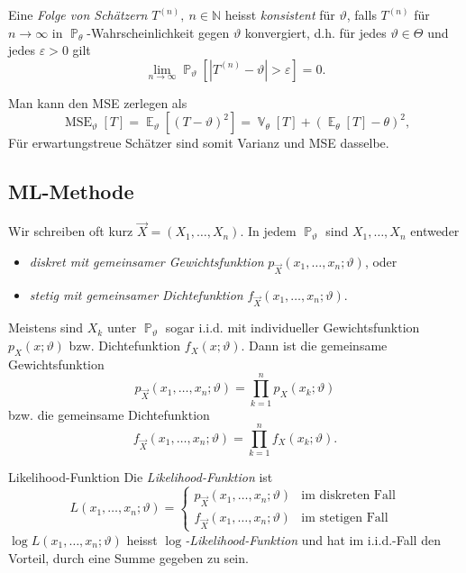 \documentclass[a4paper,10pt]{article}
\def\N{\mathbb{N}}
\renewcommand{\P}{\operatorname{\mathbb{P}}}
\DeclareMathOperator{\E}{\mathbb{E}}
\DeclareMathOperator{\V}{\mathbb{V}}
\DeclareMathOperator{\mse}{MSE}
\numberwithin{equation}{section}
\begin{document}
\begin{mainbox}{}
    Eine \emph{Folge von Schätzern} \( T^{(n)}, \ n \in \N \) heisst \emph{konsistent} für \( \vartheta \), falls \( T^{(n)} \) für \( n \to \infty \) in \( \P_\theta \)-Wahrscheinlichkeit gegen \( \vartheta \) konvergiert, d.h. für jedes \( \vartheta \in \Theta \) und jedes \( \varepsilon > 0 \) gilt
    \[
        \lim_{n \to \infty} \P_\vartheta[|T^{(n)} - \vartheta| > \varepsilon] = 0 \text{.}
    \]
\end{mainbox}

Man kann den MSE zerlegen als
\[
    \mse_\vartheta[T] = \E_\vartheta[(T - \vartheta)^2] = \V_\theta[T] + (\E_\theta[T] - \theta)^2 \text{,}
\]
Für erwartungstreue Schätzer sind somit Varianz und MSE dasselbe.

\subsection{ML-Methode}

Wir schreiben oft kurz \( \Vec{X} = (X_1, \dots, X_n) \).
In jedem \( \P_\vartheta \) sind \( X_1, \dots, X_n \) entweder
\begin{itemize}
    \item \emph{diskret mit gemeinsamer Gewichtsfunktion} \( p_{\Vec{X}}(x_1, \dots, x_n; \vartheta) \), oder
    \item \emph{stetig mit gemeinsamer Dichtefunktion} \( f_{\Vec{X}}(x_1, \dots, x_n; \vartheta) \).
\end{itemize}

Meistens sind \( X_k \) unter \( \P_\vartheta \) sogar i.i.d. mit individueller Gewichtsfunktion \( p_X(x;\vartheta) \) bzw. Dichtefunktion \( f_X(x; \vartheta) \).
Dann ist die gemeinsame Gewichtsfunktion
\[
    p_{\Vec{X}}(x_1, \dots, x_n; \vartheta) = \prod_{k = 1}^n p_X(x_k; \vartheta)
\]
bzw. die gemeinsame Dichtefunktion
\[
    f_{\Vec{X}}(x_1, \dots, x_n; \vartheta) = \prod_{k = 1}^n f_X(x_k; \vartheta) \text{.}
\]

\begin{mainbox}{Likelihood-Funktion}
    Die \emph{Likelihood-Funktion} ist
    \[
        L(x_1, \dots, x_n; \vartheta) = \begin{cases}
            p_{\Vec{X}}(x_1, \dots, x_n; \vartheta) & \text{im diskreten Fall} \\
            f_{\Vec{X}}(x_1, \dots, x_n; \vartheta) & \text{im stetigen Fall}
        \end{cases}
    \]
    \( \log L(x_1, \dots, x_n; \vartheta) \) heisst \emph{\( \log \)-Likelihood-Funktion} und hat im i.i.d.-Fall den Vorteil, durch eine Summe gegeben zu sein.
\end{mainbox}
\end{document}
